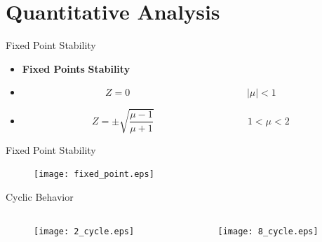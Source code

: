 \documentclass{beamer}
\begin{document}
\section{Quantitative Analysis}
\begin{frame}{Fixed Point Stability}
	\begin{itemize}
		\item
			\textbf{Fixed Points}\hspace{5cm} \textbf{Stability}
		\item
			\begin{equation*}
				Z=0 \hspace{5cm} \lvert \mu \rvert<1
			\end{equation*}

		\item
			\begin{equation*}
				Z=\pm\sqrt{\frac{\mu-1}{\mu+1}} \hspace{4cm} 1<\mu<2
			\end{equation*}
	\end{itemize}
\end{frame}

\begin{frame}{Fixed Point Stability}
	\begin{figure}
		\centering
		\texttt{[image: fixed\_point.eps]}
	\end{figure}
\end{frame}

\begin{frame}{Cyclic Behavior}
	\begin{columns}
		\begin{column}{0.5\textwidth}
			\begin{figure}
				\centering
				\texttt{[image: 2\_cycle.eps]}
			\end{figure}
		\end{column}
		\begin{column}{0.5\textwidth}
			\begin{figure}
				\centering
				\texttt{[image: 8\_cycle.eps]}
			\end{figure}
		\end{column}
	\end{columns}
\end{frame}
\end{document}
